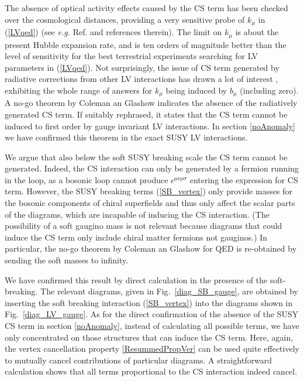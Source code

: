 \documentclass[12pt]{revtex4}
\begin{document}
 
The absence of optical activity effects caused by the CS term has been
checked over the cosmological distances, providing 
a very sensitive probe of $k_\mu$ in (\ref{LVqed}) (see {\em e.g.}
Ref. \cite{CFJ} and references therein). The limit on $k_\mu$ is about
the present Hubble expansion rate, and is ten orders of magnitude
better than the level of sensitivity for the best terrestrial
experiments searching for LV parameters in (\ref{LVqed}). Not
surprisingly, the issue of CS term generated by radiative corrections
from other LV interactions has drawn a lot of interest
\cite{CG,Jackiw:1999yp,Chung:1998jv,Andrianov:2001zj}, exhibiting the
whole range of answers for $k_\mu$ being induced by $b_\mu$ (including
zero). A no-go theorem by Coleman an Glashow \cite{CG}
indicates the absence of the radiatively generated CS
term. If suitably rephrased, it states that the CS term
cannot be induced to first order by gauge invariant LV interactions. 
In section \ref{noAnomaly} we have confirmed this theorem in the exact
SUSY LV interactions. 


We argue that also below the soft SUSY breaking scale the CS term
cannot be generated. Indeed, the CS interaction can only be generated
by a fermion running in the loop, as a bosonic loop cannot produce 
$ \epsilon^{\mu\nu\rho\sigma} $ entering the expression for CS term. 
However, the SUSY breaking terms (\ref{SB_vertex}) only 
provide masses for the bosonic components of chiral superfields
and thus only affect the scalar parts of the diagrams, which are 
incapable of inducing the CS interaction. (The possibility of a
soft gaugino mass is not relevant because diagrams that could induce
the CS term only include chiral matter fermions not gauginos.) 
In particular, the no-go theorem by Coleman an Glashow \cite{CG} for
QED is re-obtained by sending the soft masses to infinity. 


We have confirmed this result by direct calculation in the presence of
the soft-breaking. The relevant diagrams, given in
Fig.~\ref{diag_SB_gauge}, are obtained by inserting the soft breaking
interaction (\ref{SB_vertex}) into the diagrams shown in
Fig.~\ref{diag_LV_gauge}. As for the direct confirmation of the
absence of the SUSY CS term in section \ref{noAnomaly}, instead of
calculating all possible terms, we have only concentrated on those
structures that can induce the CS term. Here, again, the vertex
cancellation property \eqref{ResummedPropVer} can be used quite
effectively to mutually cancel contributions of particular diagrams.
A straightforward calculation shows that all terms proportional to the
CS interaction indeed cancel. 
\end{document}
